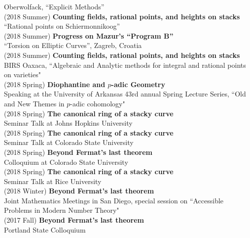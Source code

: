 \documentclass[margin,line]{res}
\begin{document}
\begin{resume}
Oberwolfack, ``Explicit Methods''
\vspace{.05cm}\\
(2018 Summer) \textbf{Counting fields, rational points, and heights on stacks}\\
``Rational points on Schiermonnikoog''
\vspace{.05cm}\\
(2018 Summer) \textbf{Progress on Mazur's ``Program B''}\\  
``Torsion on Elliptic Curves'', Zagreb, Croatia
\vspace{.05cm}\\
(2018 Summer) \textbf{Counting fields, rational points, and heights on stacks}\\
BIRS Oaxaca, ``Algebraic and Analytic methods for integral and rational points on varieties"
\vspace{.05cm}\\
(2018 Spring) \textbf{Diophantine and $p$-adic Geometry}\\
Speaking at the University of Arkansas 43rd annual Spring Lecture Series, ``Old and New Themes in $p$-adic cohomology"
\vspace{.05cm}\\
(2018 Spring) \textbf{The canonical ring of a stacky curve}\\  
Seminar Talk at Johns Hopkins University
\\
(2018 Spring) \textbf{The canonical ring of a stacky curve}\\  
Seminar Talk at Colorado State University
\\
(2018 Spring) \textbf{Beyond Fermat's last theorem}\\
Colloquium at Colorado State University 
\vspace{.05cm}\\
(2018 Spring) \textbf{The canonical ring of a stacky curve}\\  
Seminar Talk at Rice University
\vspace{.05cm}\\
(2018 Winter) \textbf{Beyond Fermat's last theorem}\\
Joint Mathematics Meetings in San Diego, special session on ``Accessible Problems in Modern Number Theory" 
\vspace{.05cm}\\
(2017 Fall) \textbf{Beyond Fermat's last theorem}\\
Portland State Colloquium
\vspace{.05cm}\\

\end{resume}
\end{document}
